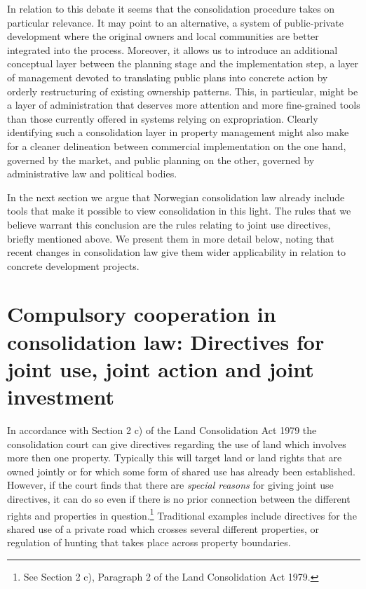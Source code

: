 \documentclass[10pt]{article} %
\begin{document}
In relation to this debate it seems that the consolidation procedure takes on particular relevance. It may point to an alternative, a system of public-private development where the original owners and local communities are better integrated into the process. Moreover, it allows us to introduce an additional conceptual layer between the planning stage and the implementation step, a layer of management devoted to translating public plans into concrete action by orderly restructuring of existing ownership patterns. This, in particular, might be a layer of administration that deserves more attention and more fine-grained tools than those currently offered in systems relying on expropriation. Clearly identifying such a consolidation layer in property management might also make for a cleaner delineation between commercial implementation on the one hand, governed by the market, and public planning on the other, governed by administrative law and political bodies. 

In the next section we argue that Norwegian consolidation law already include tools that make it possible to view consolidation in this light. The rules that we believe warrant this conclusion are the rules relating to joint use directives, briefly mentioned above. We present them in more detail below, noting that recent changes in consolidation law give them wider applicability in relation to concrete development projects. 

\section{Compulsory cooperation in consolidation law: Directives for joint use, joint action and joint investment}\label{sec:3}

In accordance with Section 2 c) of the Land Consolidation Act 1979 the consolidation court can give directives regarding the use of land which involves more then one property. Typically this will target land or land rights that are owned jointly or for which some form of shared use has already been established. However, if the court finds that there are \emph{special reasons} for giving joint use directives, it can do so even if there is no prior connection between the different rights and properties in question.\footnote{See Section 2 c), Paragraph 2 of the Land Consolidation Act 1979.} Traditional examples include directives for the shared use of a private road which crosses several different properties, or regulation of hunting that takes place across property boundaries.
\end{document}
